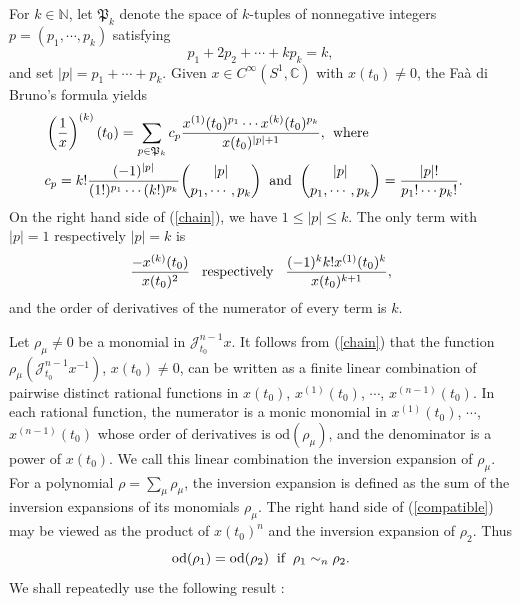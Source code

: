 \documentclass[11pt]{amsart}
\numberwithin{equation}{section}
\newcommand{\di}{\displaystyle}
\newcommand{\bn}{\mathbb{N}}
\newcommand{\sd}{\mathrm{od}}
\newcommand{\sj}{\mathscr{J}}
\newcommand{\fp}{\mathfrak{P}}
\newcommand{\sjmx}{\mathscr{J}^{n-1}_{t_0} x}
\newcommand{\cisoc}{C^{\infty}\left(S^1, \mathbb{C} \right)}
\begin{document}
For $k \in \bn$, let $\fp_{k}$ denote the space of $k$-tuples of nonnegative integers
$\di p=(p_1, \cdots, p_k)$ satisfying $$\di p_1+2p_2+\cdots +k p_k=k,$$ and set $|p|=p_1+\cdots+p_k$.
Given $\di x \in \cisoc$ with $x(t_0) \not=0$, the Fa\`{a} di Bruno's formula \cite{hu} yields
\begin{eqnarray} \label{chain}
& \di \left(\frac{1}{x} \right)^{(k)}(t_0)  =  \sum_{p \in \fp_k}  c_p \frac{x^{(1)}(t_0)^{p_{1}}
\cdots x^{(k)}(t_0)^{p_{k}}}{x(t_0)^{|p|+1}}, \hspace{1.5mm} \text{where} & \\
& \di
c_p=k ! \frac{(-1)^{|p|}}{(1!)^{p_1}  \cdots (k!)^{p_k}} \binom{|p|}{p_1, \cdots, p_k} \hspace{2mm}
\text{and} \hspace{2mm} \binom{|p|}{p_1, \cdots, p_k}=\frac{|p|!}{p_1! \cdots p_k!}. & \notag
\end{eqnarray}
On the right hand side of (\ref{chain}), we have $1 \le |p| \le k$.
The only term with $|p|=1$ respectively $|p|=k$ is
\begin{equation} \label{p=1}
\di \frac{-x^{(k)}(t_0)}{x(t_0)^2}
\hspace{3mm} \text{respectively} \hspace{3mm}  \frac{(-1)^k k! x^{(1)}(t_0)^k}{x(t_0)^{k+1}},
\end{equation}
and the order of derivatives of the numerator of every term is $k$.

Let $\rho_{\mu} \not=0$ be a monomial in $\sjmx$. It follows from (\ref{chain}) that
the function $\di \rho_{\mu} \left( \sj_{t_0}^{n-1} x^{-1} \right)$, $x(t_0) \not=0$, can be written
as a finite linear combination of pairwise distinct rational functions in
$x(t_0)$, $x^{(1)}(t_0)$, $\cdots$, $x^{(n-1)}(t_0)$. In each rational function,
the numerator is
a monic monomial in $x^{(1)}(t_0)$, $\cdots$, $x^{(n-1)}(t_0)$ whose order of derivatives is  $\sd(\rho_{\mu})$, and
the denominator is a power of $x(t_0)$.
We call this linear combination the inversion expansion of $\di \rho_{\mu}$.
For a polynomial $\rho =\sum_{\mu} \rho_{\mu}$, the inversion expansion is defined
as the sum of the inversion expansions of its monomials $\rho_{\mu}$.
The right hand side of (\ref{compatible}) may be viewed as the product of $x(t_0)^n$
and the inversion expansion of $\rho_2$. Thus
\begin{equation} \label{sd}
\sd(\rho_1)=\sd(\rho_2) \hspace{2mm} \text{if} \hspace{2mm} \rho_1 \sim_n \rho_2.
\end{equation}
We shall repeatedly use the following result
\cite[Proposition 3.1]{wz}:
\end{document}
